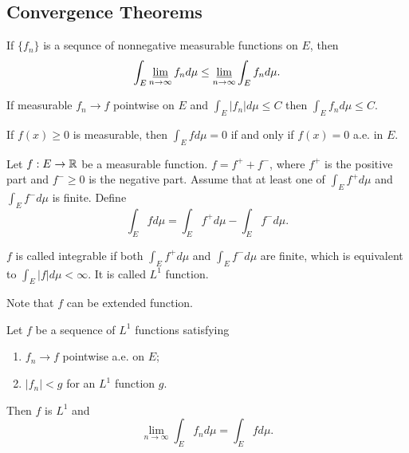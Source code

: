 \documentclass[class=book, crop=false]{standalone}
\begin{document}
        \subsection{Convergence Theorems}
        \begin{theorem}
            If $\{f_n\}$ is a sequnce of nonnegative measurable functions on $E$, then
            \begin{equation*}
                \int_E \varliminf_{n \rightarrow \infty} f_n d\mu \leq \varliminf_{n \rightarrow \infty} \int_E f_n d\mu.
            \end{equation*}
        \end{theorem}
        \begin{corollary}
            If measurable $f_n \rightarrow f$ pointwise on $E$ and $\int_E |f_n| d\mu \leq C$ then $\int_E f_n d\mu \leq C$.
        \end{corollary}
        
        \begin{theorem}
            If $f(x) \geq 0$ is measurable, then $\int_E f d\mu = 0$ if and only if $f(x) = 0$ a.e. in $E$.
        \end{theorem}

        \begin{definition}
            Let $f : E \rightarrow \mathbb{R}$ be a measurable function. $f = f^+ + f^-$, where $f^+$ is the positive part and $f^- \geq 0$ is the negative part. Assume that at least one of $\int_E f^+ d\mu$ and $\int_E f^- d\mu$ is finite. Define
            \begin{equation*}
                \int_E f d\mu = \int_E f^+ d\mu - \int_E f^- d\mu.
            \end{equation*}
        \end{definition}

        \begin{definition}
            $f$ is called integrable if both $\int_E f^+ d\mu$ and $\int_E f^- d\mu$ are finite, which is equivalent to $\int_E |f| d\mu < \infty$. It is called $L^1$ function.
        \end{definition}
        \begin{remark}
            Note that $f$ can be extended function.
        \end{remark}

        \begin{theorem}
            Let $f$ be a sequence of $L^1$ functions satisfying
            \begin{enumerate}
                \item $f_n \rightarrow f$ pointwise a.e. on $E$;
                \item $|f_n| < g$ for an $L^1$ function $g$.
            \end{enumerate}
            Then $f$ is $L^1$ and
            \begin{equation*}
                \lim_{n \rightarrow \infty} \int_E f_n d\mu = \int_E f d\mu.
            \end{equation*}
        \end{theorem}
\end{document}
